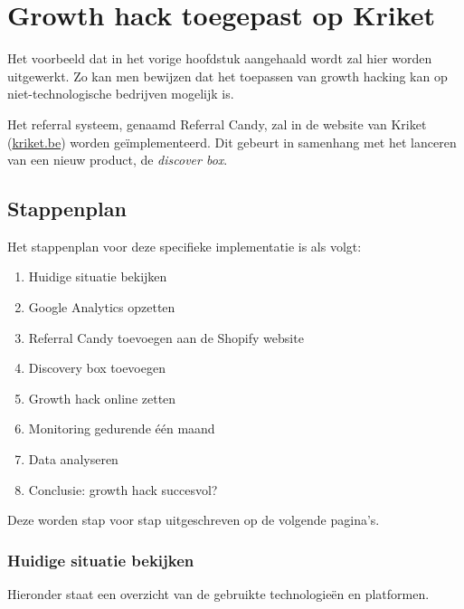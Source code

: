 
\chapter{Growth hack toegepast op Kriket}
\label{ch:implementatie}

Het voorbeeld dat in het vorige hoofdstuk aangehaald wordt zal hier worden uitgewerkt. Zo kan men bewijzen dat het toepassen van growth hacking kan op niet-technologische bedrijven mogelijk is. 

Het referral systeem, genaamd Referral Candy, zal in de website van Kriket (\href{https://kriket.be}{kriket.be}) worden geïmplementeerd. Dit gebeurt in samenhang met het lanceren van een nieuw product, de \emph{discover box}.

\section{Stappenplan}
\label{sec:implementatie-stappenplan}

Het stappenplan voor deze specifieke implementatie is als volgt:

\begin{enumerate}
	\item Huidige situatie bekijken
	\item Google Analytics opzetten
	\item Referral Candy toevoegen aan de Shopify website
	\item Discovery box toevoegen
	\item Growth hack online zetten
	\item Monitoring gedurende één maand
	\item Data analyseren
	\item Conclusie: growth hack succesvol?
\end{enumerate}

Deze worden stap voor stap uitgeschreven op de volgende pagina's. 

\subsection{Huidige situatie bekijken} \label{sec:huidige-situatie-analyseren}

Hieronder staat een overzicht van de gebruikte technologieën en platformen.

